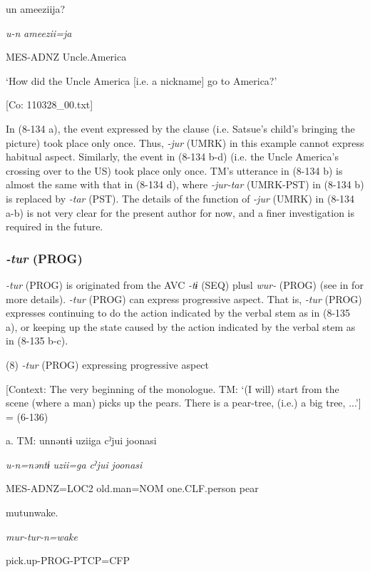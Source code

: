       un  ameeziija?

      \textit{u-n}  \textit{ameezii=ja}

      MES-ADNZ  Uncle.America

      ‘How did the Uncle America [i.e. a nickname] go to America?’

      [Co: 110328\_00.txt]

In (8-134 a), the event expressed by the clause (i.e. Satsue’s child’s bringing the picture) took place only once. Thus, \textit{{}-jur} (UMRK) in this example cannot express habitual aspect. Similarly, the event in (8-134 b-d) (i.e. the Uncle America’s crossing over to the US) took place only once. TM’s utterance in (8-134 b) is almost the same with that in (8-134 d), where \textit{{}-jur-tar} (UMRK-PST) in (8-134 b) is replaced by \textit{{}-tar} (PST). The details of the function of \textit{{}-jur} (UMRK) in (8-134 a-b) is not very clear for the present author for now, and a finer investigation is required in the future.

\subsubsection{\textit{{}-tur} (PROG)}

\textit{{}-tur} (PROG) is originated from the AVC \textit{{}-tɨ} (SEQ) plusl \textit{wur-} (PROG) (see  in  for more details). \textit{{}-tur} (PROG) can express progressive aspect. That is, \textit{{}-tur} (PROG) expresses continuing to do the action indicated by the verbal stem as in (8-135 a), or keeping up the state caused by the action indicated by the verbal stem as in (8-135 b-c).

(8)  \textit{{}-tur} (PROG) expressing progressive aspect

  [Context: The very beginning of the monologue. TM: ‘(I will) start from the scene (where a man) picks up the pears. There is a pear-tree, (i.e.) a big tree, ...’] = (6-136)

  a.  TM:  unnəntɨ  uziiga  cˀjui  joonasi

      \textit{u-n=nəntɨ}  \textit{uzii=ga}  \textit{cˀjui}  \textit{joonasi}

      MES-ADNZ=LOC2  old.man=NOM  one.CLF.person  pear

      mutunwake.

      \textit{mur-tur{}-n=wake}

      pick.up-PROG-PTCP=CFP

